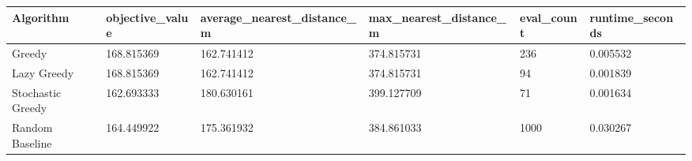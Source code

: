 \begin{tabular}{llllll}
\hline
Algorithm & objective_value & average_nearest_distance_m & max_nearest_distance_m & eval_count & runtime_seconds \\
\hline
Greedy & 168.815369 & 162.741412 & 374.815731 & 236 & 0.005532 \\
Lazy Greedy & 168.815369 & 162.741412 & 374.815731 & 94 & 0.001839 \\
Stochastic Greedy & 162.693333 & 180.630161 & 399.127709 & 71 & 0.001634 \\
Random Baseline & 164.449922 & 175.361932 & 384.861033 & 1000 & 0.030267 \\
\hline
\end{tabular}
